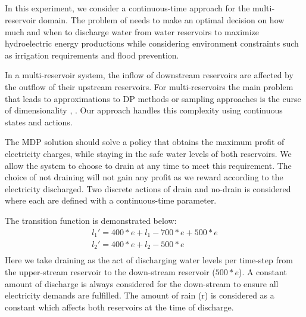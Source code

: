 \subsection{\WaterReservoir}

In this experiment, we consider a continuous-time approach for the multi-reservoir domain. The problem of \WaterReservoir  needs to make an optimal decision on how much and when to discharge water from water reservoirs to maximize hydroelectric energy productions while considering environment constraints such as irrigation requirements and flood prevention. 

In a multi-reservoir system, the inflow of downstream reservoirs are affected by the outflow of their upstream reservoirs. 
For multi-reservoirs the main problem that leads to approximations to DP methods or sampling approaches is the curse of dimensionality \cite{Mahootchi2009}, \cite{Yeh1985}. Our approach handles this complexity using continuous states and actions.


The MDP solution should solve a policy that obtains the maximum profit of electricity charges, while staying in the safe water levels of both reservoirs. We allow the system to choose to drain at any time to meet this requirement. The choice of not draining will not gain any profit as we reward according to the electricity discharged. Two discrete actions of drain and no-drain is considered where each are defined with a continuous-time parameter. 

The transition function is demonstrated below: 
{\footnotesize
\begin{align*}
l_1'  = 400 * e + l_1 -700 * e + 500 * e \\
l_2'  = 400 * e + l_2 - 500 * e \\
\end{align*}
}
Here we take draining as the act of discharging water levels per time-step from the upper-stream reservoir to the down-stream reservoir ($500 * e$). A constant amount of discharge is always considered for the down-stream to ensure all electricity demands are fulfilled.  The amount of rain (r) is considered as a constant which affects both reservoirs at the time of discharge. 


